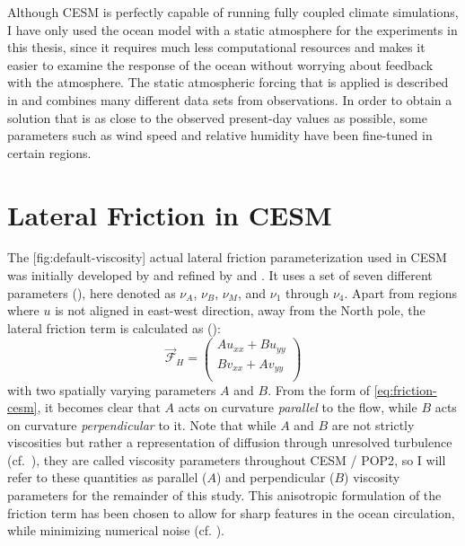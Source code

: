 Although \ac{CESM} is perfectly capable of running fully coupled climate simulations, I have only used the ocean model with a static atmosphere for the experiments in this thesis, since it requires much less computational resources and makes it easier to examine the response of the ocean without worrying about feedback with the atmosphere. The static atmospheric forcing that is applied is described in \cite{largeforcing} and combines many different data sets from observations. In order to obtain a solution that is as close to the observed present-day values as possible, some parameters such as wind speed and relative humidity have been fine-tuned in certain regions.

\section{Lateral Friction in CESM}
\label{sec:cesm-friction}
The%
%
[fig:default-viscosity]%
{}%
%
actual lateral friction parameterization used in CESM was initially developed by \citet{large} and refined by \citet{smithvisc} and \citet{jochum}. It uses a set of seven different parameters (), here denoted as \(\nu_A\), \(\nu_B\), \(\nu_M\), and \(\nu_1\) through \(\nu_4\). Apart from regions where \(u\) is not aligned in east-west direction, \ie away from the North pole, the lateral friction term is calculated as (\cite{pop2}):
%
\begin{equation}
\vec{\mathcal{F}}_H = 
	\begin{pmatrix}
		Au_{xx} + Bu_{yy} \\
		Bv_{xx} + Av_{yy} \\
	\end{pmatrix}
	\label{eq:friction-cesm}
\end{equation}  
%
with two spatially varying parameters \(A\) and \(B\). From the form of \eqref{eq:friction-cesm}, it becomes clear that \(A\) acts on curvature \emph{parallel} to the flow, while \(B\) acts on curvature \emph{perpendicular} to it. Note that while \(A\) and \(B\) are not strictly viscosities but rather a representation of diffusion through unresolved turbulence (cf.\ ), they are called viscosity parameters throughout \ac{CESM} / \ac{POP2}, so I will refer to these quantities as parallel (\(A\)) and perpendicular (\(B\)) viscosity parameters for the remainder of this study. This anisotropic formulation of the friction term has been chosen to allow for sharp features in the ocean circulation, while minimizing numerical noise (cf. ).


